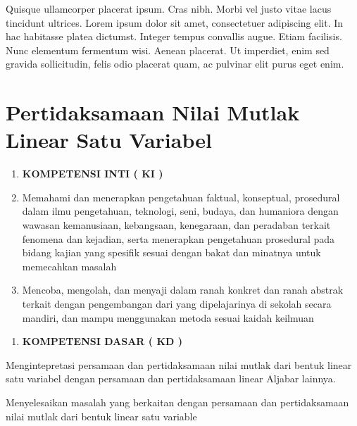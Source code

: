 \documentclass[11pt,fleqn]{book} %
\begin{document}
Quisque ullamcorper placerat ipsum. Cras nibh. Morbi vel justo vitae lacus tincidunt ultrices. Lorem ipsum dolor sit amet, consectetuer adipiscing elit. In hac habitasse platea dictumst. Integer tempus convallis augue. Etiam facilisis. Nunc elementum fermentum wisi. Aenean placerat. Ut imperdiet, enim sed gravida sollicitudin, felis odio placerat quam, ac pulvinar elit purus eget enim.


\section{Pertidaksamaan Nilai Mutlak Linear Satu Variabel}

\begin{enumerate}
\item  \textbf{KOMPETENSI INTI ( KI )}

\item \textbf{ }Memahami dan menerapkan pengetahuan faktual, konseptual, prosedural dalam ilmu pengetahuan, teknologi, seni, budaya, dan humaniora dengan wawasan kemanusiaan, kebangsaan, kenegaraan, dan peradaban terkait fenomena dan kejadian, serta menerapkan pengetahuan prosedural pada bidang kajian yang spesifik sesuai dengan bakat dan minatnya untuk memecahkan masalah

\item  Mencoba, mengolah, dan menyaji dalam ranah konkret dan ranah abstrak  terkait dengan pengembangan dari yang dipelajarinya di sekolah secara mandiri, dan mampu menggunakan metoda sesuai kaidah keilmuan
\end{enumerate}

\noindent 

\begin{enumerate}
\item  \textbf{KOMPETENSI DASAR ( KD )}
\end{enumerate}

  Mengintepretasi persamaan dan pertidaksamaan nilai mutlak dari bentuk linear satu variabel dengan persamaan dan pertidaksamaan linear Aljabar lainnya.

 Menyelesaikan masalah yang berkaitan dengan persamaan dan pertidaksamaan nilai mutlak dari bentuk linear satu variable

\noindent 
\end{document}
